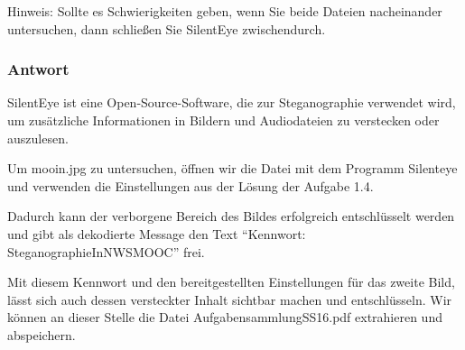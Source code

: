 \documentclass{article}
\begin{document}
Hinweis: Sollte es Schwierigkeiten geben, wenn Sie beide Dateien nacheinander 
untersuchen, dann schließen Sie SilentEye zwischendurch.

\subsubsection*{Antwort}

SilentEye ist eine Open-Source-Software, die zur Steganographie verwendet wird, um 
zusätzliche Informationen in Bildern und Audiodateien zu verstecken oder auszulesen. 

Um mooin.jpg zu untersuchen, öffnen wir die Datei mit dem Programm Silenteye und 
verwenden die Einstellungen aus der Lösung der Aufgabe 1.4.

Dadurch kann der verborgene Bereich des Bildes erfolgreich entschlüsselt werden und 
gibt als dekodierte Message den Text ``Kennwort: SteganographieInNWSMOOC'' frei.

Mit diesem Kennwort und den bereitgestellten Einstellungen für das zweite Bild, lässt 
sich auch dessen versteckter Inhalt sichtbar machen und entschlüsseln. Wir können an 
dieser Stelle die Datei AufgabensammlungSS16.pdf extrahieren und abspeichern.
\end{document}
